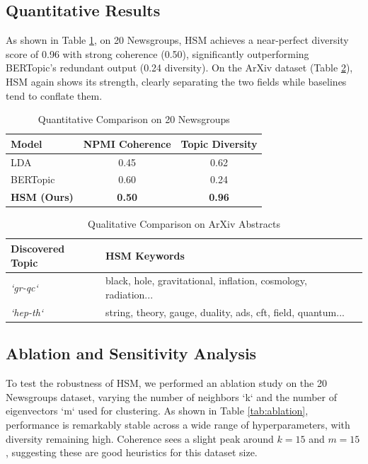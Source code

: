 \documentclass[conference]{IEEEtran}
\begin{document}
\subsection{Quantitative Results}
As shown in Table \ref{tab:quantitative}, on 20 Newsgroups, HSM achieves a near-perfect diversity score of 0.96 with strong coherence (0.50), significantly outperforming BERTopic's redundant output (0.24 diversity). On the ArXiv dataset (Table \ref{tab:arxiv}), HSM again shows its strength, clearly separating the two fields while baselines tend to conflate them.

\begin{table}[h]
\caption{Quantitative Comparison on 20 Newsgroups}
\label{tab:quantitative}
\centering
\begin{tabular}{@{}lcc@{}}
\toprule
\textbf{Model} & \textbf{NPMI Coherence} & \textbf{Topic Diversity} \\ \midrule
LDA & 0.45 & 0.62 \\
BERTopic & 0.60 & 0.24 \\
\textbf{HSM (Ours)} & \textbf{0.50} & \textbf{0.96} \\ \bottomrule
\end{tabular}
\end{table}

\begin{table}[h]
\caption{Qualitative Comparison on ArXiv Abstracts}
\label{tab:arxiv}
\centering
\begin{tabular}{@{}ll@{}}
\toprule
\textbf{Discovered Topic} & \textbf{HSM Keywords} \\ \midrule
\textit{`gr-qc`} & black, hole, gravitational, inflation, cosmology, radiation... \\
\textit{`hep-th`} & string, theory, gauge, duality, ads, cft, field, quantum... \\ \bottomrule
\end{tabular}
\end{table}

\subsection{Ablation and Sensitivity Analysis}
To test the robustness of HSM, we performed an ablation study on the 20 Newsgroups dataset, varying the number of neighbors `k` and the number of eigenvectors `m` used for clustering. As shown in Table \ref{tab:ablation}, performance is remarkably stable across a wide range of hyperparameters, with diversity remaining high. Coherence sees a slight peak around $k=15$ and $m=15$, suggesting these are good heuristics for this dataset size.
\end{document}

